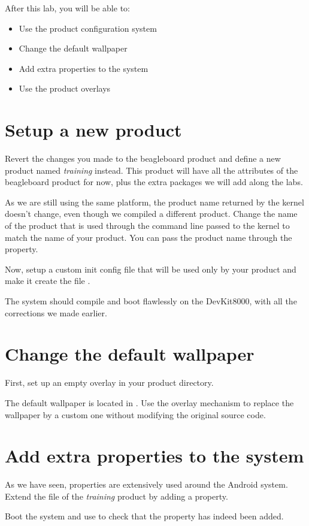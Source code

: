 
After this lab, you will be able to:
\begin{itemize}
  \item Use the product configuration system
  \item Change the default wallpaper
  \item Add extra properties to the system
  \item Use the product overlays
\end{itemize}

\section{Setup a new product}

Revert the changes you made to the beagleboard product and define a new product
named \textit{training} instead. This product will have all the attributes of
the beagleboard product for now, plus the extra packages we will add along the
labs.

As we are still using the same platform, the product name returned by the
kernel doesn't change, even though we compiled a different product. Change
the name of the product that is used through the command line passed to the
kernel to match the name of your product. You can pass the product name through
the  property.

Now, setup a custom init config file that will be used only by your product and
make it create the file .

The system should compile and boot flawlessly on the DevKit8000, with all the
corrections we made earlier.

\section{Change the default wallpaper}

First, set up an empty overlay in your product directory.

The default wallpaper is located in .
Use the overlay mechanism to replace the wallpaper by a custom one without
modifying the original source code.

\section{Add extra properties to the system}

As we have seen, properties are extensively used around the Android system.
Extend the  file of the \textit{training} product by adding a
 property.

Boot the system and use  to check that the property has indeed been added.
